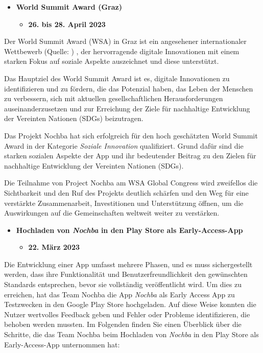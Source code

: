 \begin{itemize}
    \item \textbf{World Summit Award (Graz)}
          \begin{itemize}
              \item \textbf{26. bis 28. April 2023}
          \end{itemize}
\end{itemize}

Der World Summit Award (WSA) in Graz ist ein angesehener internationaler Wettbewerb (Quelle: \cite{wsa-global} ) , der hervorragende digitale Innovationen mit einem starken Fokus auf soziale Aspekte auszeichnet und diese unterstützt.

Das Hauptziel des World Summit Award ist es, digitale Innovationen zu identifizieren und zu fördern, die das Potenzial haben, das Leben der Menschen zu verbessern, sich mit aktuellen gesellschaftlichen Herausforderungen auseinanderzusetzen und zur Erreichung der Ziele für nachhaltige Entwicklung der Vereinten Nationen (SDGs) beizutragen.

Das Projekt Nochba hat sich erfolgreich für den hoch geschätzten World Summit Award in der Kategorie \textit{Soziale Innovation} qualifiziert. Grund dafür sind die starken sozialen Aspekte der App und ihr bedeutender Beitrag zu den Zielen für nachhaltige Entwicklung der Vereinten Nationen (SDGs).

Die Teilnahme von Project Nochba am WSA Global Congress wird zweifellos die Sichtbarkeit und den Ruf des Projekts deutlich schärfen und den Weg für eine verstärkte Zusammenarbeit, Investitionen und Unterstützung öffnen, um die Auswirkungen auf die Gemeinschaften weltweit weiter zu verstärken.

\begin{itemize}
    \item \textbf{Hochladen von \textit{Nochba} in den Play Store als Early-Access-App}
          \begin{itemize}
              \item \textbf{22. März 2023}
          \end{itemize}
\end{itemize}

Die Entwicklung einer App umfasst mehrere Phasen, und es muss sichergestellt werden, dass ihre Funktionalität und Benutzerfreundlichkeit den gewünschten Standards entsprechen, bevor sie vollständig veröffentlicht wird. Um dies zu erreichen, hat das Team Nochba die App \textit{Nochba} als Early Access App zu Testzwecken in den Google Play Store hochgeladen. Auf diese Weise konnten die Nutzer wertvolles Feedback geben und Fehler oder Probleme identifizieren, die behoben werden mussten. Im Folgenden finden Sie einen Überblick über die Schritte, die das Team Nochba beim Hochladen von \textit{Nochba} in den Play Store als Early-Access-App unternommen hat:

